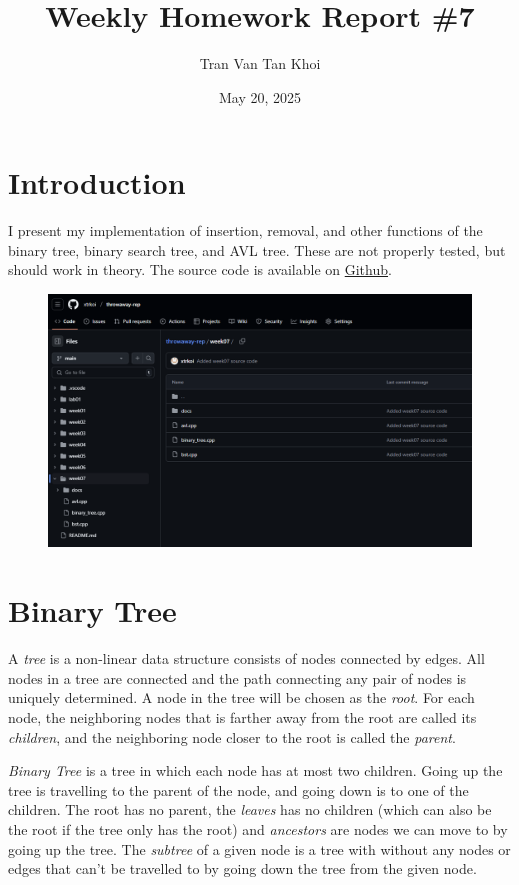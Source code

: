 \documentclass{article}
\author{Tran Van Tan Khoi}
\date{May 20, 2025}
\title{Weekly Homework Report \#7}
\begin{document}
\maketitle

\section{Introduction}
\label{introduction}

I present my implementation of insertion, removal, and other functions of the binary tree, binary search tree, and AVL tree. These are not properly tested, but should work in theory. The source code is available on \href{https://github.com/xtrkoi/throwaway-rep}{Github}.

\begin{figure}[h]
    \centering
    \includegraphics[width=12cm]{images/github_page.png}
\end{figure}


\section{Binary Tree}
\label{binary_tree}

A \emph{tree} is a non-linear data structure consists of nodes connected by edges. All nodes in a tree are connected and the path connecting any pair of nodes is uniquely determined. A node in the tree will be chosen as the \emph{root}. For each node, the neighboring nodes that is farther away from the root are called its \emph{children}, and the neighboring node closer to the root is called the \emph{parent}.

\emph{Binary Tree} is a tree in which each node has at most two children. Going up the tree is travelling to the parent of the node, and going down is to one of the children. The root has no parent, the \emph{leaves} has no children (which can also be the root if the tree only has the root) and \emph{ancestors} are nodes we can move to by going up the tree. The \emph{subtree} of a given node is a tree with without any nodes or edges that can't be travelled to by going down the tree from the given node.
\end{document}

